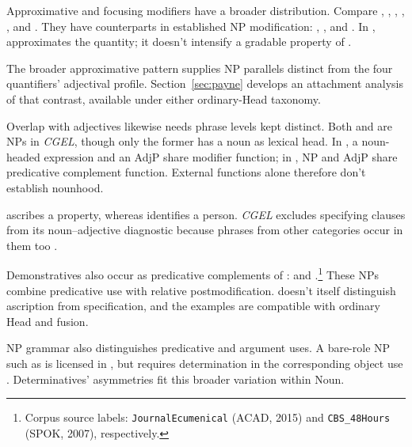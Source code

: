 \documentclass[12pt]{article}
\begin{document}
Approximative and focusing modifiers have a broader distribution. Compare , , , , , and . They have counterparts in established NP modification: , , and . In ,  approximates the quantity; it doesn't intensify a gradable property of .

The broader approximative pattern supplies NP parallels distinct from the four quantifiers' adjectival profile. Section~\ref{sec:payne} develops an attachment analysis of that contrast, available under either ordinary-Head taxonomy.

Overlap with adjectives likewise needs phrase levels kept distinct. Both  and  are NPs in \textit{CGEL}, though only the former has a noun as lexical head. In , a noun-headed expression and an AdjP share modifier function; in , NP and AdjP share predicative complement function. External functions alone therefore don't establish nounhood.

 ascribes a property, whereas  identifies a person. \textit{CGEL} excludes specifying  clauses from its noun--adjective diagnostic because phrases from other categories occur in them too \citep[536]{huddleston2002}.

Demonstratives also occur as predicative complements of :  and .\footnote{Corpus source labels: \texttt{JournalEcumenical} (ACAD, 2015) and \texttt{CBS\_48Hours} (SPOK, 2007), respectively.} These NPs combine predicative use with relative postmodification.  doesn't itself distinguish ascription from specification, and the examples are compatible with ordinary Head and fusion.

NP grammar also distinguishes predicative and argument uses. A bare-role NP such as  is licensed in , but requires determination in the corresponding object use  \citep[328]{huddleston2002}. Determinatives' asymmetries fit this broader variation within Noun.
\end{document}
